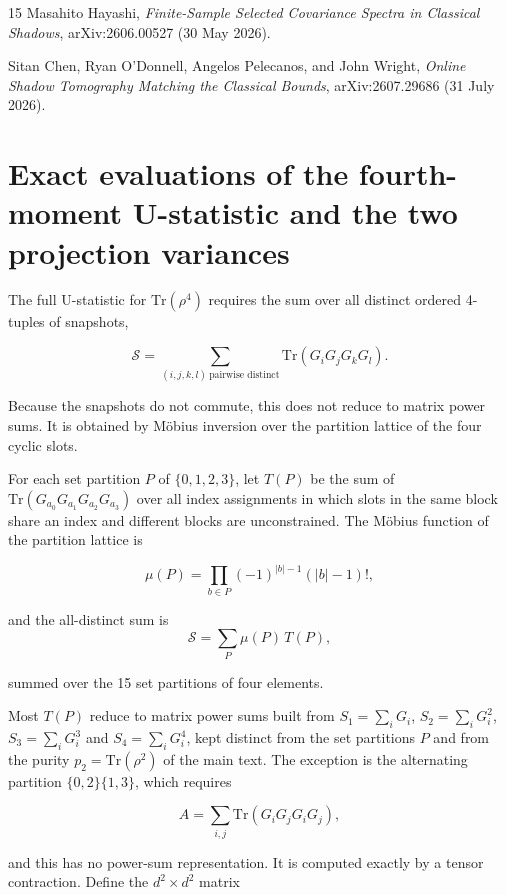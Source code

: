 \documentclass[a4paper,superscriptaddress,nofootinbib,onecolumn,nopdfoutputerror]{quantumarticle}
\begin{document}
\begin{thebibliography}{15}
Masahito Hayashi,
\emph{Finite-Sample Selected Covariance Spectra in Classical Shadows},
arXiv:2606.00527 (30 May 2026).

Sitan Chen, Ryan O'Donnell, Angelos Pelecanos, and John Wright,
\emph{Online Shadow Tomography Matching the Classical Bounds},
arXiv:2607.29686 (31 July 2026).

\end{thebibliography}

\appendix
\hypertarget{appendix-a.-the-exact-fourth-moment-u-statistic}{%
\section{Exact evaluations of the fourth-moment U-statistic and the two projection
variances}\label{appendix-a.-the-exact-fourth-moment-u-statistic}}

The full U-statistic for \(\mathrm{Tr}(\rho^4)\) requires the sum over
all distinct ordered 4-tuples of snapshots,

\[\mathcal{S} = \sum_{(i,j,k,l)\ \text{pairwise distinct}} \mathrm{Tr}(G_i G_j G_k G_l).\]

Because the snapshots do not commute, this does not reduce to matrix
power sums. It is obtained by M\"obius inversion over the partition
lattice of the four cyclic slots.

For each set partition \(P\) of \(\{0,1,2,3\}\), let \(T(P)\) be the sum
of \(\mathrm{Tr}(G_{a_0} G_{a_1} G_{a_2} G_{a_3})\) over all index
assignments in which slots in the same block share an index and
different blocks are unconstrained. The M\"obius function of the
partition lattice is

\[\mu(P) = \prod_{b \in P} (-1)^{|b|-1} (|b|-1)! ,\]

and the all-distinct sum is \[\mathcal{S} = \sum_{P} \mu(P)\, T(P),\]

summed over the 15 set partitions of four elements.

Most \(T(P)\) reduce to matrix power sums built from
\(S_1 = \sum_i G_i\), \(S_2 = \sum_i G_i^2\), \(S_3 = \sum_i G_i^3\) and
\(S_4 = \sum_i G_i^4\), kept distinct from the set partitions \(P\) and from the purity
\(p_2 = \mathrm{Tr}(\rho^2)\) of the main text. The exception is the alternating partition
\(\{0,2\}\{1,3\}\), which requires

\[A = \sum_{i,j} \mathrm{Tr}(G_i G_j G_i G_j),\]

and this has no power-sum representation. It is computed exactly by a
tensor contraction. Define the \(d^2 \times d^2\) matrix
\end{document}
